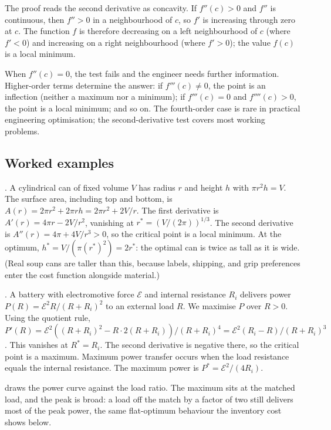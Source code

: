 The proof reads the second derivative as concavity. If $f''(c) >
0$ and $f''$ is continuous, then $f'' > 0$ in a neighbourhood of
$c$, so $f'$ is increasing through zero at $c$. The function $f$
is therefore decreasing on a left neighbourhood of $c$ (where
$f' < 0$) and increasing on a right neighbourhood (where $f' >
0$); the value $f(c)$ is a local minimum.

When $f''(c) = 0$, the test fails and the engineer needs further
information. Higher-order terms determine the answer: if $f'''(c)
\neq 0$, the point is an inflection (neither a maximum nor a
minimum); if $f'''(c) = 0$ and $f''''(c) > 0$, the point is a
local minimum; and so on. The fourth-order case is rare in
practical engineering optimisation; the second-derivative test
covers most working problems.

\subsection{Worked examples}

. A cylindrical can of fixed volume $V$ has
radius $r$ and height $h$ with $\pi r^{2} h = V$. The surface
area, including top and bottom, is $A(r) = 2\pi r^{2} + 2\pi r h
= 2\pi r^{2} + 2 V / r$. The first derivative is $A'(r) = 4\pi r
- 2 V / r^{2}$, vanishing at $r^{*} = (V / (2\pi))^{1/3}$. The
second derivative is $A''(r) = 4\pi + 4 V / r^{3} > 0$, so the
critical point is a local minimum. At the optimum, $h^{*} = V/
(\pi (r^{*})^{2}) = 2 r^{*}$: the optimal can is twice as tall as
it is wide. (Real soup cans are taller than this, because labels,
shipping, and grip preferences enter the cost function alongside
material.)

. A battery with electromotive
force $\mathcal{E}$ and internal resistance $R_{i}$ delivers power
$P(R) = \mathcal{E}^{2} R / (R + R_{i})^{2}$ to an external load
$R$. We maximise $P$ over $R > 0$. Using the quotient rule,
$P'(R) = \mathcal{E}^{2} ((R + R_{i})^{2} - R \cdot 2(R + R_{i}))
/ (R + R_{i})^{4} = \mathcal{E}^{2} (R_{i} - R) / (R + R_{i})^{3}$.
This vanishes at $R^{*} = R_{i}$. The second derivative is
negative there, so the critical point is a maximum. Maximum power
transfer occurs when the load resistance equals the internal
resistance. The maximum power is $P^{*} = \mathcal{E}^{2} / (4
R_{i})$.



 draws the power curve against
the load ratio. The maximum sits at the matched load, and the peak
is broad: a load off the match by a factor of two still delivers
most of the peak power, the same flat-optimum behaviour the
inventory cost shows below.

